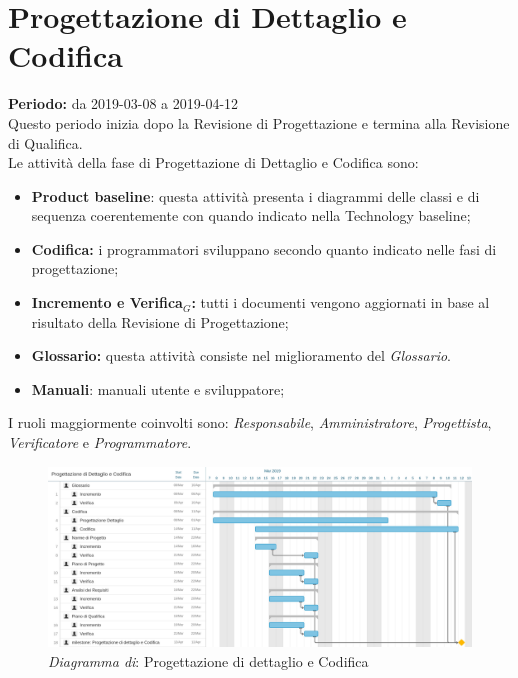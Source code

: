 \section{Progettazione di Dettaglio e Codifica}
\textbf{Periodo:} da 2019-03-08 a 2019-04-12\\
Questo periodo inizia dopo la Revisione di Progettazione e termina  alla Revisione di Qualifica.\\Le attività della fase di Progettazione di Dettaglio e Codifica sono:
\begin{itemize}
	\item \textbf{Product baseline}: questa attività presenta i diagrammi delle classi e di sequenza coerentemente con quando indicato nella Technology baseline; 
    \item \textbf{Codifica:} i programmatori sviluppano secondo quanto indicato nelle fasi di progettazione;
    \item \textbf{Incremento e Verifica$_{G}$:} tutti i documenti vengono aggiornati in base al risultato della Revisione di Progettazione;
    \item \textbf{Glossario:} questa attività consiste nel miglioramento del \textit{Glossario}.
    \item \textbf{Manuali}: manuali utente e sviluppatore;
\end{itemize}
I ruoli maggiormente coinvolti sono: \textit{Responsabile}, \textit{Amministratore}, \textit{Progettista}, \textit{Verificatore} e \textit{Programmatore}.
\begin{figure} [h]
    \centering
    \includegraphics[scale=0.14]{./images/codifica.jpg}
    \caption{\textit{Diagramma di}: Progettazione di dettaglio e Codifica }\label{}
\end{figure}
\newpage
